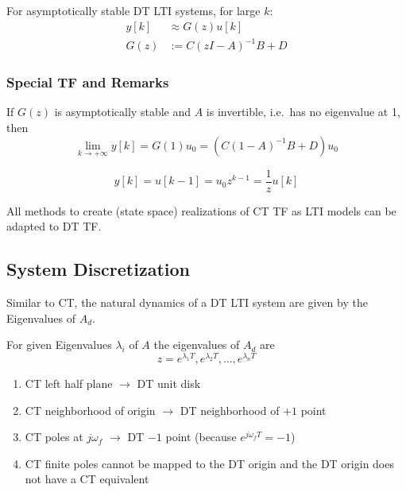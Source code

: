
For asymptotically stable DT LTI systems, for large $k$:
\begin{align*}
    y[k] & \approx G(z)u[k]    \\
    G(z) & :=C{(zI-A)}^{-1}B+D
\end{align*}
\subsubsection{Special TF and Remarks}

If $G(z)$ is asymptotically stable and $A$ is invertible, i.e.\ has no eigenvalue at 1, then
\begin{equation*}
    \lim_{k\to+\infty}y[k]=G(1)u_0=(C{(1-A)}^{-1}B+D)u_0
\end{equation*}


\begin{equation*}
    y[k] =u[k-1] =u_0z^{k-1}=\frac1zu[k]
\end{equation*}


All methods to create (state space) realizations of CT TF as LTI models can be adapted to DT TF.\

\subsection{System Discretization}

Similar to CT, the natural dynamics of a DT LTI system are given by the Eigenvalues of $A_d$.

For given Eigenvalues $\lambda_i$ of $A$ the eigenvalues of $A_d$ are
\begin{equation*}
    z=e^{\lambda_1T},e^{\lambda_2T},\ldots,e^{\lambda_{n}T}
\end{equation*}


\begin{enumerate}
    \item CT left half plane $\rightarrow$ DT unit disk
    \item CT neighborhood of origin $\rightarrow$ DT neighborhood of $+1$ point
    \item CT poles at $j\omega_f$ $\rightarrow$ DT $-1$ point (because $e^{j\omega_{f}T}=-1$)
    \item CT finite poles cannot be mapped to the DT origin and the DT origin does not have a CT equivalent
\end{enumerate}


